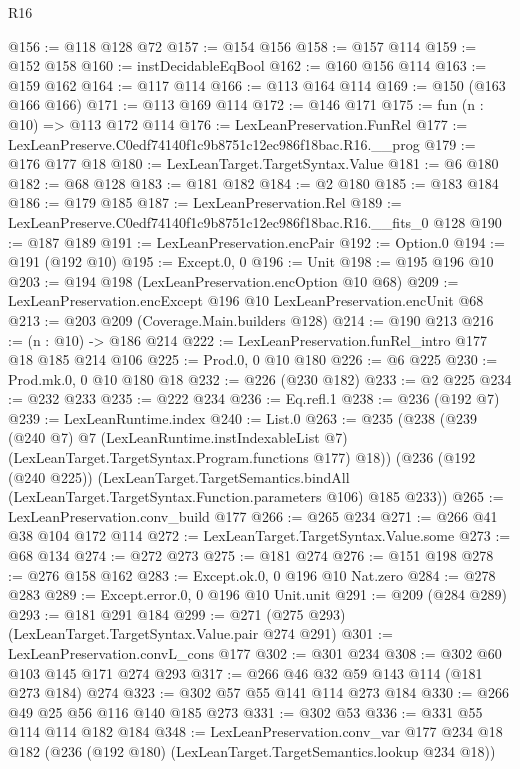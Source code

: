 \begin{lexlean}{R16}
\begin{coremodule}
@156 := @118 @128 @72
@157 := @154 @156
@158 := @157 @114
@159 := @152 @158
@160 := instDecidableEqBool
@162 := @160 @156 @114
@163 := @159 @162
@164 := @117 @114
@166 := @113 @164 @114
@169 := @150 (@163 @166 @166)
@171 := @113 @169 @114
@172 := @146 @171
@175 := fun (n : @10) => @113 @172 @114
@176 := LexLeanPreservation.FunRel
@177 := LexLeanPreserve.C0edf74140f1c9b8751c12ec986f18bac.R16.__prog
@179 := @176 @177 @18
@180 := LexLeanTarget.TargetSyntax.Value
@181 := @6 @180
@182 := @68 @128
@183 := @181 @182
@184 := @2 @180
@185 := @183 @184
@186 := @179 @185
@187 := LexLeanPreservation.Rel
@189 := LexLeanPreserve.C0edf74140f1c9b8751c12ec986f18bac.R16.__fits_0 @128
@190 := @187 @189
@191 := LexLeanPreservation.encPair
@192 := Option.{0}
@194 := @191 (@192 @10)
@195 := Except.{0, 0}
@196 := Unit
@198 := @195 @196 @10
@203 := @194 @198 (LexLeanPreservation.encOption @10 @68)
@209 := LexLeanPreservation.encExcept @196 @10 LexLeanPreservation.encUnit @68
@213 := @203 @209 (Coverage.Main.builders @128)
@214 := @190 @213
@216 := (n : @10) -> @186 @214
@222 := LexLeanPreservation.funRel_intro @177 @18 @185 @214 @106
@225 := Prod.{0, 0} @10 @180
@226 := @6 @225
@230 := Prod.mk.{0, 0} @10 @180 @18
@232 := @226 (@230 @182)
@233 := @2 @225
@234 := @232 @233
@235 := @222 @234
@236 := Eq.refl.{1}
@238 := @236 (@192 @7)
@239 := LexLeanRuntime.index
@240 := List.{0}
@263 := @235
    (@238
      (@239
        (@240 @7)
        @7
        (LexLeanRuntime.instIndexableList @7)
        (LexLeanTarget.TargetSyntax.Program.functions @177)
        @18))
    (@236
      (@192 (@240 @225))
      (LexLeanTarget.TargetSemantics.bindAll
        (LexLeanTarget.TargetSyntax.Function.parameters @106)
        @185
        @233))
@265 := LexLeanPreservation.conv_build @177
@266 := @265 @234
@271 := @266 @41 @38 @104 @172 @114
@272 := LexLeanTarget.TargetSyntax.Value.some
@273 := @68 @134
@274 := @272 @273
@275 := @181 @274
@276 := @151 @198
@278 := @276 @158 @162
@283 := Except.ok.{0, 0} @196 @10 Nat.zero
@284 := @278 @283
@289 := Except.error.{0, 0} @196 @10 Unit.unit
@291 := @209 (@284 @289)
@293 := @181 @291 @184
@299 := @271 (@275 @293) (LexLeanTarget.TargetSyntax.Value.pair @274 @291)
@301 := LexLeanPreservation.convL_cons @177
@302 := @301 @234
@308 := @302 @60 @103 @145 @171 @274 @293
@317 := @266 @46 @32 @59 @143 @114 (@181 @273 @184) @274
@323 := @302 @57 @55 @141 @114 @273 @184
@330 := @266 @49 @25 @56 @116 @140 @185 @273
@331 := @302 @53
@336 := @331 @55 @114 @114 @182 @184
@348 := LexLeanPreservation.conv_var
    @177
    @234
    @18
    @182
    (@236 (@192 @180) (LexLeanTarget.TargetSemantics.lookup @234 @18))

\end{coremodule}
\end{lexlean}
